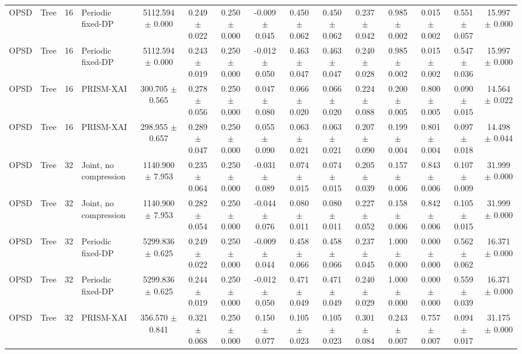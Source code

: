 \begin{tabular}{llllccccccccccc}
OPSD & Tree & 16 & Periodic fixed-DP & 5112.594 $\pm$ 0.000 & 0.249 $\pm$ 0.022 & 0.250 $\pm$ 0.000 & -0.009 $\pm$ 0.045 & 0.450 $\pm$ 0.062 & 0.450 $\pm$ 0.062 & 0.237 $\pm$ 0.042 & 0.985 $\pm$ 0.002 & 0.015 $\pm$ 0.002 & 0.551 $\pm$ 0.057 & 15.997 $\pm$ 0.000 \\
OPSD & Tree & 16 & Periodic fixed-DP & 5112.594 $\pm$ 0.000 & 0.243 $\pm$ 0.019 & 0.250 $\pm$ 0.000 & -0.012 $\pm$ 0.050 & 0.463 $\pm$ 0.047 & 0.463 $\pm$ 0.047 & 0.240 $\pm$ 0.028 & 0.985 $\pm$ 0.002 & 0.015 $\pm$ 0.002 & 0.547 $\pm$ 0.036 & 15.997 $\pm$ 0.000 \\
OPSD & Tree & 16 & PRISM-XAI & 300.705 $\pm$ 0.565 & 0.278 $\pm$ 0.056 & 0.250 $\pm$ 0.000 & 0.047 $\pm$ 0.080 & 0.066 $\pm$ 0.020 & 0.066 $\pm$ 0.020 & 0.224 $\pm$ 0.088 & 0.200 $\pm$ 0.005 & 0.800 $\pm$ 0.005 & 0.090 $\pm$ 0.015 & 14.564 $\pm$ 0.022 \\
OPSD & Tree & 16 & PRISM-XAI & 298.955 $\pm$ 0.657 & 0.289 $\pm$ 0.047 & 0.250 $\pm$ 0.000 & 0.055 $\pm$ 0.090 & 0.063 $\pm$ 0.021 & 0.063 $\pm$ 0.021 & 0.207 $\pm$ 0.090 & 0.199 $\pm$ 0.004 & 0.801 $\pm$ 0.004 & 0.097 $\pm$ 0.018 & 14.498 $\pm$ 0.044 \\
OPSD & Tree & 32 & Joint, no compression & 1140.900 $\pm$ 7.953 & 0.235 $\pm$ 0.064 & 0.250 $\pm$ 0.000 & -0.031 $\pm$ 0.089 & 0.074 $\pm$ 0.015 & 0.074 $\pm$ 0.015 & 0.205 $\pm$ 0.039 & 0.157 $\pm$ 0.006 & 0.843 $\pm$ 0.006 & 0.107 $\pm$ 0.009 & 31.999 $\pm$ 0.000 \\
OPSD & Tree & 32 & Joint, no compression & 1140.900 $\pm$ 7.953 & 0.282 $\pm$ 0.054 & 0.250 $\pm$ 0.000 & -0.044 $\pm$ 0.076 & 0.080 $\pm$ 0.011 & 0.080 $\pm$ 0.011 & 0.227 $\pm$ 0.052 & 0.158 $\pm$ 0.006 & 0.842 $\pm$ 0.006 & 0.105 $\pm$ 0.015 & 31.999 $\pm$ 0.000 \\
OPSD & Tree & 32 & Periodic fixed-DP & 5299.836 $\pm$ 0.625 & 0.249 $\pm$ 0.022 & 0.250 $\pm$ 0.000 & -0.009 $\pm$ 0.044 & 0.458 $\pm$ 0.066 & 0.458 $\pm$ 0.066 & 0.237 $\pm$ 0.045 & 1.000 $\pm$ 0.000 & 0.000 $\pm$ 0.000 & 0.562 $\pm$ 0.062 & 16.371 $\pm$ 0.000 \\
OPSD & Tree & 32 & Periodic fixed-DP & 5299.836 $\pm$ 0.625 & 0.244 $\pm$ 0.019 & 0.250 $\pm$ 0.000 & -0.012 $\pm$ 0.050 & 0.471 $\pm$ 0.049 & 0.471 $\pm$ 0.049 & 0.240 $\pm$ 0.029 & 1.000 $\pm$ 0.000 & 0.000 $\pm$ 0.000 & 0.559 $\pm$ 0.039 & 16.371 $\pm$ 0.000 \\
OPSD & Tree & 32 & PRISM-XAI & 356.570 $\pm$ 0.841 & 0.321 $\pm$ 0.068 & 0.250 $\pm$ 0.000 & 0.150 $\pm$ 0.077 & 0.105 $\pm$ 0.023 & 0.105 $\pm$ 0.023 & 0.301 $\pm$ 0.084 & 0.243 $\pm$ 0.007 & 0.757 $\pm$ 0.007 & 0.094 $\pm$ 0.017 & 31.175 $\pm$ 0.000 \\

\end{tabular}
